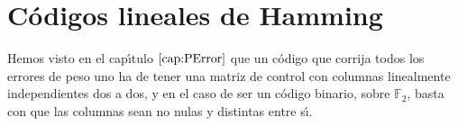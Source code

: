 %
%

\chapter{C\'odigos lineales de Hamming}

Hemos visto en el cap\'{\i}tulo $\ref{cap:PError}$ que un c\'odigo que
corrija todos los
errores de peso uno ha de tener una matriz de control con columnas linealmente
independientes dos a dos, y en el caso de ser un c\'odigo binario, sobre
$\mathbb{F}_2$, basta con que las columnas sean no nulas y distintas entre
s\'{\i}.

%
%



%
%



%
%


